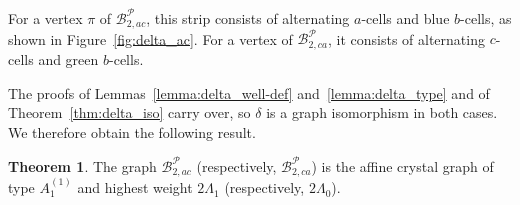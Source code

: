 \documentclass[11pt]{article}
\theoremstyle{definition}
\newtheorem{theorem}{Theorem}[section]
\theoremstyle{remark}
\theoremstyle{definition}
\numberwithin{equation}{section}
\begin{document}
For a vertex $\pi$ of $\mathcal{B}_{2,ac}^{\mathcal{P}}$, this strip consists of alternating $a$-cells and blue $b$-cells, as shown in Figure~\ref{fig:delta_ac}. For a vertex of $\mathcal{B}_{2,ca}^{\mathcal{P}}$, it consists of alternating $c$-cells and green $b$-cells.

The proofs of Lemmas~\ref{lemma:delta_well-def} and~\ref{lemma:delta_type} and of Theorem~\ref{thm:delta_iso} carry over, so $\delta$ is a graph isomorphism in both cases. We therefore obtain the following result.

\begin{theorem}\label{thm:grounded_crystal_ac}
The graph $\mathcal{B}_{2,ac}^{\mathcal{P}}$ (respectively, $\mathcal{B}_{2,ca}^{\mathcal{P}}$) is the affine crystal graph of type $A_1^{(1)}$ and highest weight $2\Lambda_1$ (respectively, $2\Lambda_0$).
\end{theorem}
\end{document}
